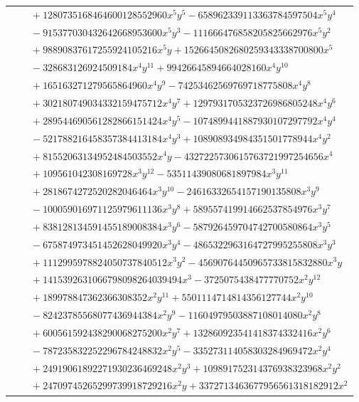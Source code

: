 \documentclass[11pt]{article}
\begin{document}
\begin{longtable}{@{}ll@{}}
 & $\quad +1280735168464600128552960x^{5}y^{5}-658962339113363784597504x^{5}y^{4}$\\
 & $\quad -915377030432642668953600x^{5}y^{3}-111666476858205825662976x^{5}y^{2}$\\
 & $\quad +98890837617255924105216x^{5}y+1526645082680259343338700800x^{5}$\\
 & $\quad -328683126924509184x^{4}y^{11}+99426645894664028160x^{4}y^{10}$\\
 & $\quad +165163271279565864960x^{4}y^{9}-74253462569769718775808x^{4}y^{8}$\\
 & $\quad +302180749034332159475712x^{4}y^{7}+1297931705323726986805248x^{4}y^{6}$\\
 & $\quad +289544690561282866151424x^{4}y^{5}-1074899441887930107297792x^{4}y^{4}$\\
 & $\quad -521788216458357384413184x^{4}y^{3}+108908934984351501778944x^{4}y^{2}$\\
 & $\quad +81552063134952484503552x^{4}y-4327225730615763721997254656x^{4}$\\
 & $\quad +109561042308169728x^{3}y^{12}-53511439080681897984x^{3}y^{11}$\\
 & $\quad +2818674272520282046464x^{3}y^{10}-24616332654157190135808x^{3}y^{9}$\\
 & $\quad -100059016971125979611136x^{3}y^{8}+589557419914662537854976x^{3}y^{7}$\\
 & $\quad +838128134591455189008384x^{3}y^{6}-587926459704742700580864x^{3}y^{5}$\\
 & $\quad -675874973451452628049920x^{3}y^{4}-4865322963164727995255808x^{3}y^{3}$\\
 & $\quad +1112995978824050737840512x^{3}y^{2}-45690764450965733815832880x^{3}y$\\
 & $\quad +1415392631066798098264039494x^{3}-3725075438477770752x^{2}y^{12}$\\
 & $\quad +189978847362366308352x^{2}y^{11}+5501114714814356127744x^{2}y^{10}$\\
 & $\quad -82423785568077436944384x^{2}y^{9}-11604979503887108014080x^{2}y^{8}$\\
 & $\quad +600561592438290068275200x^{2}y^{7}+132860923541418374332416x^{2}y^{6}$\\
 & $\quad -787235832252296784248832x^{2}y^{5}-335273114058303284969472x^{2}y^{4}$\\
 & $\quad +24919061892271930236469248x^{2}y^{3}+109891752314376938323968x^{2}y^{2}$\\
 & $\quad +24709745265299739918729216x^{2}y+3372713463677956561318182912x^{2}$\\

\end{longtable}
\end{document}
